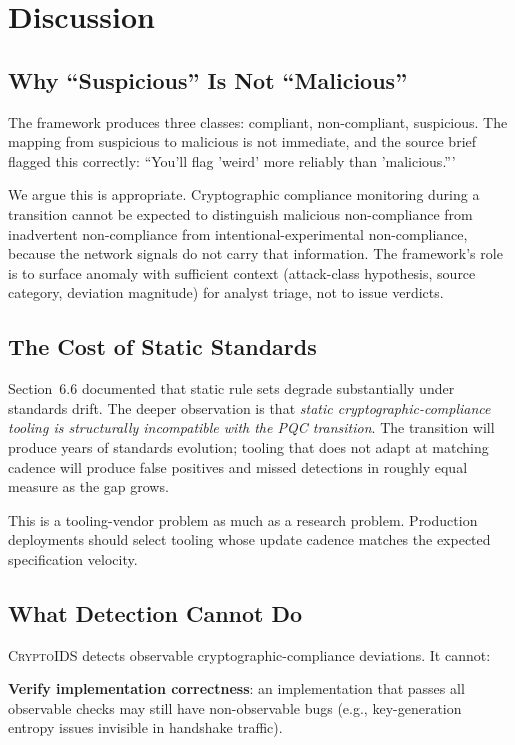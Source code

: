 \documentclass[sigconf,nonacm]{acmart}
\begin{document}
\section{Discussion}

\subsection{Why ``Suspicious'' Is Not ``Malicious''}

The framework produces three classes: compliant, non-compliant,
suspicious. The mapping from suspicious to malicious is not
immediate, and the source brief flagged this correctly: ``You'll
flag 'weird' more reliably than 'malicious.'''

We argue this is appropriate. Cryptographic compliance monitoring
during a transition cannot be expected to distinguish malicious
non-compliance from inadvertent non-compliance from
intentional-experimental non-compliance, because the network
signals do not carry that information. The framework's role is
to surface anomaly with sufficient context (attack-class
hypothesis, source category, deviation magnitude) for analyst
triage, not to issue verdicts.

\subsection{The Cost of Static Standards}

Section~6.6 documented that static rule sets degrade substantially
under standards drift. The deeper observation is that
\emph{static cryptographic-compliance tooling is structurally
incompatible with the PQC transition}. The transition will produce
years of standards evolution; tooling that does not adapt at
matching cadence will produce false positives and missed
detections in roughly equal measure as the gap grows.

This is a tooling-vendor problem as much as a research problem.
Production deployments should select tooling whose update cadence
matches the expected specification velocity.

\subsection{What Detection Cannot Do}

\textsc{CryptoIDS} detects observable cryptographic-compliance
deviations. It cannot:

\textbf{Verify implementation correctness}: an implementation that
passes all observable checks may still have non-observable bugs
(e.g., key-generation entropy issues invisible in handshake
traffic).
\end{document}
